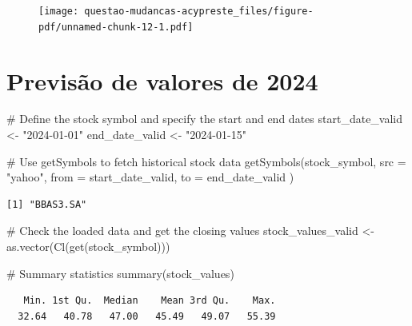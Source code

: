 \documentclass[
  letterpaper,
  DIV=11,
  numbers=noendperiod]{scrreprt}
\newenvironment{Shaded}{\begin{snugshade}}{\end{snugshade}}
\newcommand{\AttributeTok}[1]{\textcolor[rgb]{0.40,0.45,0.13}{#1}}
\newcommand{\CommentTok}[1]{\textcolor[rgb]{0.37,0.37,0.37}{#1}}
\newcommand{\FunctionTok}[1]{\textcolor[rgb]{0.28,0.35,0.67}{#1}}
\newcommand{\NormalTok}[1]{\textcolor[rgb]{0.00,0.23,0.31}{#1}}
\newcommand{\OtherTok}[1]{\textcolor[rgb]{0.00,0.23,0.31}{#1}}
\newcommand{\StringTok}[1]{\textcolor[rgb]{0.13,0.47,0.30}{#1}}
\begin{document}
\begin{figure}[H]

{\centering \texttt{[image: questao-mudancas-acypreste\_files/figure-pdf/unnamed-chunk-12-1.pdf]}

}

\end{figure}

\hypertarget{previsuxe3o-de-valores-de-2024-1}{%
\section*{Previsão de valores de
2024}\label{previsuxe3o-de-valores-de-2024-1}}


\begin{Shaded}
\begin{Highlighting}[]
\CommentTok{\# Define the stock symbol and specify the start and end dates}
\NormalTok{start\_date\_valid }\OtherTok{\textless{}{-}} \StringTok{"2024{-}01{-}01"}
\NormalTok{end\_date\_valid }\OtherTok{\textless{}{-}} \StringTok{"2024{-}01{-}15"}

\CommentTok{\# Use getSymbols to fetch historical stock data}
\FunctionTok{getSymbols}\NormalTok{(stock\_symbol,}
    \AttributeTok{src =} \StringTok{"yahoo"}\NormalTok{,}
    \AttributeTok{from =}\NormalTok{ start\_date\_valid,}
    \AttributeTok{to =}\NormalTok{ end\_date\_valid}
\NormalTok{)}
\end{Highlighting}
\end{Shaded}

\begin{verbatim}
[1] "BBAS3.SA"
\end{verbatim}

\begin{Shaded}
\begin{Highlighting}[]
\CommentTok{\# Check the loaded data and get the closing values}
\NormalTok{stock\_values\_valid }\OtherTok{\textless{}{-}} \FunctionTok{as.vector}\NormalTok{(}\FunctionTok{Cl}\NormalTok{(}\FunctionTok{get}\NormalTok{(stock\_symbol)))}

\CommentTok{\# Summary statistics}
\FunctionTok{summary}\NormalTok{(stock\_values)}
\end{Highlighting}
\end{Shaded}

\begin{verbatim}
   Min. 1st Qu.  Median    Mean 3rd Qu.    Max. 
  32.64   40.78   47.00   45.49   49.07   55.39 
\end{verbatim}
\end{document}
